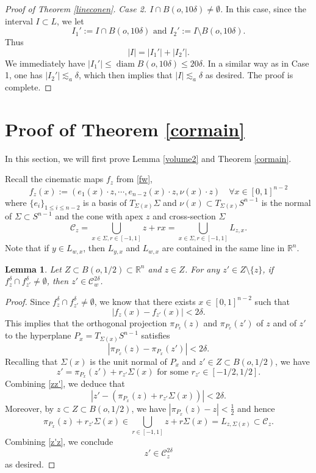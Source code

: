 \documentclass[11pt,a4paper,reqno]{amsart}
\newcommand{\R}{\mathbb{R}}
\newcommand{\calC}{\mathcal{C}}
\newcommand{\1}{\mathbf{1}}
\newcommand{\diam}{\operatorname{diam}}
\numberwithin{equation}{section}
\theoremstyle{plain}
\newtheorem{lemma}[equation]{Lemma}
\theoremstyle{definition}
\theoremstyle{remark}
\begin{document}
\begin{proof}[Proof of Theorem \ref{lineconen}]
\medskip
    \emph{Case 2. $I \cap B(o,10 \delta) \ne \emptyset$.}
In this case, since the interval $I \subset L$, we let
$$ I_1':= I \cap B(o,10 \delta) \mbox{ and } I_2':= I \setminus B(o,10 \delta).  $$
Thus
$$  |I| = |I_1'| + |I_2'|. $$
We immediately have $|I_1'| \le \diam B(o,10 \delta) \le 20 \delta.$
In a similar way as in Case 1, one has $|I_2'| \lesssim_a \delta$, which then implies that
$|I| \lesssim_a \delta$ as desired.
The proof is complete.
\end{proof}



\section{Proof of Theorem \ref{cormain}} \label{s5}
In this section, we will first prove Lemma \ref{volume2} and Theorem \ref{cormain}.



Recall the cinematic maps $f_z$ from \eqref{fw},
$$f_z(x):=(e_1(x)\cdot z, \cdots, e_{n-2}(x)\cdot z,  \nu(x)\cdot z) \quad \forall x\in [0,1]^{n-2}$$
where $\{e_i\}_{1 \le i \le n-2}$ is a basis of $T_{\Sigma(x)}\Sigma$ and $\nu(x)\subset T_{\Sigma(x)}S^{n-1}$ is the normal of $\Sigma\subset S^{n-1}$
and the cone with apex $z$ and cross-section $\Sigma$
$$ \calC_z = \bigcup_{x \in \Sigma,r \in [-1,1]} z + rx = \bigcup_{x \in \Sigma,r \in [-1,1]} L_{z,x}. $$
Note that if $y \in L_{w,x}$, then $L_{y,x}$ and $L_{w,x}$ are contained in the same line in $\R^n$.




\begin{lemma} \label{pairs}
    Let $Z \subset B(o,1/2) \subset \R^n$ and $z \in Z$. For any $z' \in Z \setminus\{z\}$,
    if $f_z^\delta \cap f_{z'}^\delta \ne \emptyset$, then $z' \in \calC_w^{2\delta}$.
\end{lemma}


\begin{proof}
   Since $f_z^\delta \cap f_{z'}^\delta \ne \emptyset$, we know that there exists $x \in [0,1]^{n-2}$ such that
   $$ |f_z(x)-f_{z'}(x)| < 2\delta. $$
   This implies that the orthogonal projection $\pi_{P_x}(z)$ and $\pi_{P_{x}}(z')$ of $z$ and of $z'$ to the hyperplane $P_{x}= T_{\Sigma(x)}S^{n-1}$
   satisfies
   \begin{equation}\label{zz'}
     |\pi_{P_{x}}(z)-\pi_{P_{x}}(z')| < 2\delta.
   \end{equation}
   Recalling that $\Sigma(x)$ is the unit normal of $P_{x}$ and $z' \in Z \subset B(o,1/2)$, we have
   $$  z' = \pi_{P_{x}}(z') + r_{z'}\Sigma(x) \mbox{ for some $r_{z'} \in [-1/2,1/2]$}.  $$
   Combining \eqref{zz'}, we deduce that
   \begin{equation}\label{z'z}
     |z' - (\pi_{P_{x}}(z) + r_{z'}\Sigma(x))|  < 2\delta.
   \end{equation}
   Moreover,
   by $z \subset Z \subset B(o,1/2)$, we have $|\pi_{P_{x}}(z)-z| < \frac12$ and hence
   $$  \pi_{P_{x}}(z) + r_{z'}\Sigma(x) \in  \bigcup_{r \in [-1,1]} z + r\Sigma(x) = L_{z,\Sigma(x)} \subset \calC_z.  $$
   Combining \eqref{z'z}, we conclude
   $$   z' \in \calC_z^{2 \delta}$$
   as desired.
\end{proof}
\end{document}
